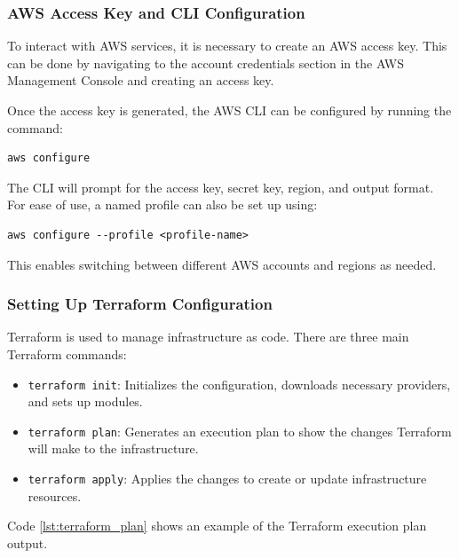 \subsubsection{AWS Access Key and CLI Configuration}
To interact with AWS services, it is necessary to create an AWS access key. This can be done by navigating to the account credentials section in the AWS Management Console and creating an access key.

Once the access key is generated, the AWS CLI can be configured by running the command:
\begin{verbatim}
aws configure
\end{verbatim}
The CLI will prompt for the access key, secret key, region, and output format. For ease of use, a named profile can also be set up using:
\begin{verbatim}
aws configure --profile <profile-name>
\end{verbatim}
This enables switching between different AWS accounts and regions as needed.

\subsubsection{Setting Up Terraform Configuration}
Terraform is used to manage infrastructure as code. There are three main Terraform commands:
\begin{itemize}
    \item \texttt{terraform init}: Initializes the configuration, downloads necessary providers, and sets up modules.
    \item \texttt{terraform plan}: Generates an execution plan to show the changes Terraform will make to the infrastructure.
    \item \texttt{terraform apply}: Applies the changes to create or update infrastructure resources.
\end{itemize}

Code \ref{lst:terraform_plan} shows an example of the Terraform execution plan output.

